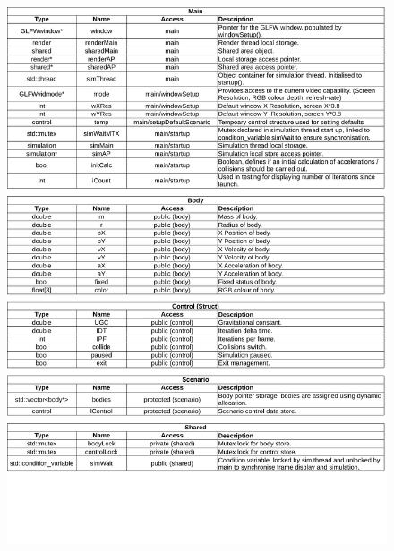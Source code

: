 \begin{figure}[H]
   \centering
   \includegraphics[page=3, width=\textwidth]{../varlist.pdf} 
\end{figure}